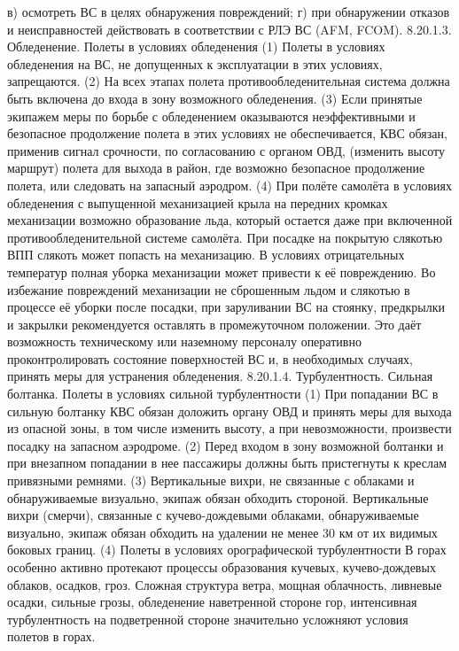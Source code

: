 в)	осмотреть ВС в целях обнаружения повреждений;
г)	при обнаружении отказов и неисправностей действовать в соответствии с РЛЭ ВС (AFM, FCOM).
8.20.1.3.	Обледенение. Полеты в условиях обледенения
(1) Полеты в условиях обледенения на ВС, не допущенных к эксплуатации в этих условиях, запрещаются.
(2) На всех этапах полета противообледенительная система должна быть включена до входа в зону возможного обледенения.
(3) Если принятые экипажем меры по борьбе с обледенением оказываются неэффективными и безопасное продолжение полета в этих условиях не обеспечивается, КВС обязан, применив сигнал срочности, по согласованию с органом ОВД, (изменить высоту маршрут) полета для выхода в район, где возможно безопасное продолжение полета, или следовать на запасный аэродром.
(4) При полёте самолёта в условиях обледенения с выпущенной механизацией крыла на передних кромках механизации возможно образование льда, который остается даже при включенной противообледенительной системе самолёта.
При посадке на покрытую слякотью ВПП слякоть может попасть на механизацию. В условиях отрицательных температур полная уборка механизации может привести к её повреждению.
Во избежание повреждений механизации не сброшенным льдом и слякотью в процессе её уборки после посадки, при заруливании ВС на стоянку, предкрылки и закрылки рекомендуется оставлять в промежуточном положении. Это даёт возможность техническому или наземному персоналу оперативно проконтролировать состояние поверхностей ВС и, в необходимых случаях, принять меры для устранения обледенения.
8.20.1.4.	Турбулентность. Сильная болтанка. Полеты в условиях сильной турбулентности
(1) При попадании ВС в сильную болтанку КВС обязан доложить органу ОВД и принять меры для выхода из опасной зоны, в том числе изменить высоту, а при невозможности, произвести посадку на запасном аэродроме.
(2) Перед входом в зону возможной болтанки и при внезапном попадании в нее пассажиры должны быть пристегнуты к креслам привязными ремнями.
(3) Вертикальные вихри, не связанные с облаками и обнаруживаемые визуально, экипаж обязан обходить стороной. Вертикальные вихри (смерчи), связанные с кучево-дождевыми облаками, обнаруживаемые визуально, экипаж обязан обходить на удалении не менее 30 км от их видимых боковых границ. 
(4) Полеты в условиях орографической турбулентности
В горах особенно активно протекают процессы образования кучевых, кучево-дождевых облаков, осадков, гроз.
Сложная структура ветра, мощная облачность, ливневые осадки, сильные грозы, обледенение наветренной стороне гор, интенсивная турбулентность на подветренной стороне значительно усложняют условия полетов в горах.
